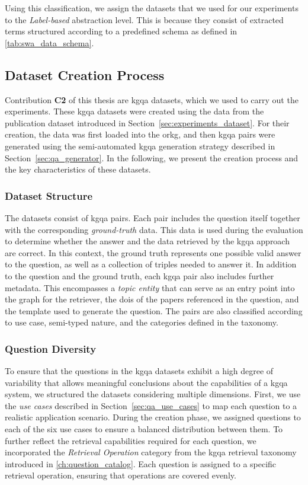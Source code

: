 Using this classification, we assign the datasets that we used for our experiments to the \emph{Label-based} abstraction level. This is because they consist of extracted terms structured according to a predefined schema as defined in \autoref{tab:swa_data_schema}.

\subsection{Dataset Creation Process}
\label{sec:label_based_qa_dataset}

Contribution \textbf{C2} of this thesis are \gls{kgqa} datasets, which we used to carry out the experiments. These \gls{kgqa} datasets were created using the data from the publication dataset introduced in Section~\ref{sec:experiments_dataset}. For their creation, the data was first loaded into the \gls{orkg}, and then \gls{kgqa} pairs were generated using the semi-automated \gls{kgqa} generation strategy described in Section~\ref{sec:qa_generator}. In the following, we present the creation process and the key characteristics of these datasets.

\subsubsection{Dataset Structure} 

The datasets consist of \gls{kgqa} pairs. Each pair includes the question itself together with the corresponding \emph{ground-truth} data. This data is used during the evaluation to determine whether the answer and the data retrieved by the \gls{kgqa} approach are correct. In this context, the ground truth represents one possible valid answer to the question, as well as a collection of triples needed to answer it. In addition to the question and the ground truth, each \gls{kgqa} pair also includes further metadata. This encompasses a \emph{topic entity} that can serve as an entry point into the graph for the retriever, the \glspl{doi} of the papers referenced in the question, and the template used to generate the question. The pairs are also classified according to use case, semi-typed nature, and the categories defined in the taxonomy.

\subsubsection{Question Diversity}

To ensure that the questions in the \gls{kgqa} datasets exhibit a high degree of variability that allows meaningful conclusions about the capabilities of a \gls{kgqa} system, we structured the datasets considering multiple dimensions. First, we use the \emph{use cases} described in Section~\ref{sec:qa_use_cases} to map each question to a realistic application scenario. During the creation phase, we assigned questions to each of the six use cases to ensure a balanced distribution between them. To further reflect the retrieval capabilities required for each question, we incorporated the \emph{Retrieval Operation} category from the \gls{kgqa} retrieval taxonomy introduced in \autoref{ch:question_catalog}. Each question is assigned to a specific retrieval operation, ensuring that operations are covered evenly. 

